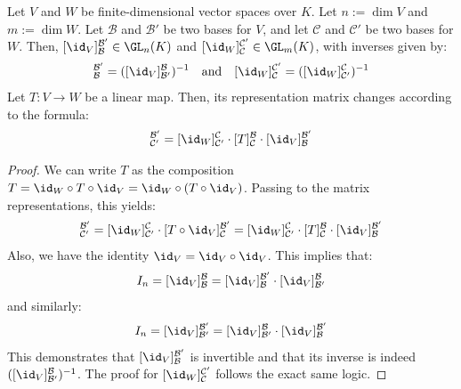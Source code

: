 \begin{corollary}
\label{cor:change_of_basis_formula}
Let $V$ and $W$ be finite-di\-men\-sional vector spaces over $K$. Let $n := \dim V$ and $m := \dim W$. Let $\mathcal{B}$ and $\mathcal{B}'$ be two bases for $V$, and let $\mathcal{C}$ and $\mathcal{C}'$ be two bases for $W$. Then, $[\id_V]_{\mathcal{B}}^{\mathcal{B}'} \in \GL_n(K)$ and $[\id_W]_{\mathcal{C}}^{\mathcal{C}'} \in \GL_m(K)$, with inverses given by:
\begin{equation*}
    [\id_V]_{\mathcal{B}}^{\mathcal{B}'} = ([\id_V]_{\mathcal{B}'}^{\mathcal{B}})^{-1} \quad \text{and} \quad [\id_W]_{\mathcal{C}}^{\mathcal{C}'} = ([\id_W]_{\mathcal{C}'}^{\mathcal{C}})^{-1}
\end{equation*}
Let $T: V \to W$ be a linear map. Then, its representation matrix changes according to the formula:
\begin{equation*}
    [T]_{\mathcal{C}'}^{\mathcal{B}'} = [\id_W]_{\mathcal{C}'}^{\mathcal{C}} \cdot [T]_{\mathcal{C}}^{\mathcal{B}} \cdot [\id_V]_{\mathcal{B}}^{\mathcal{B}'}
\end{equation*}
\end{corollary}

\begin{proof}
We can write $T$ as the composition $T = \id_W \circ T \circ \id_V = \id_W \circ (T \circ \id_V)$. Passing to the matrix representations, this yields:
\begin{equation*}
    [T]_{\mathcal{C}'}^{\mathcal{B}'} = [\id_W]_{\mathcal{C}'}^{\mathcal{C}} \cdot [T \circ \id_V]_{\mathcal{C}}^{\mathcal{B}'} = [\id_W]_{\mathcal{C}'}^{\mathcal{C}} \cdot [T]_{\mathcal{C}}^{\mathcal{B}} \cdot [\id_V]_{\mathcal{B}}^{\mathcal{B}'}
\end{equation*}
Also, we have the identity $\id_V = \id_V \circ \id_V$. This implies that:
\begin{equation*}
    I_n = [\id_V]_{\mathcal{B}}^{\mathcal{B}} = [\id_V]_{\mathcal{B}}^{\mathcal{B}'} \cdot [\id_V]_{\mathcal{B}'}^{\mathcal{B}}
\end{equation*}
and similarly:
\begin{equation*}
    I_n = [\id_V]_{\mathcal{B}'}^{\mathcal{B}'} = [\id_V]_{\mathcal{B}'}^{\mathcal{B}} \cdot [\id_V]_{\mathcal{B}}^{\mathcal{B}'}
\end{equation*}
This demonstrates that $[\id_V]_{\mathcal{B}}^{\mathcal{B}'}$ is invertible and that its inverse is indeed $([\id_V]_{\mathcal{B}'}^{\mathcal{B}})^{-1}$. The proof for $[\id_W]_{\mathcal{C}}^{\mathcal{C}'}$ follows the exact same logic.
\end{proof}


